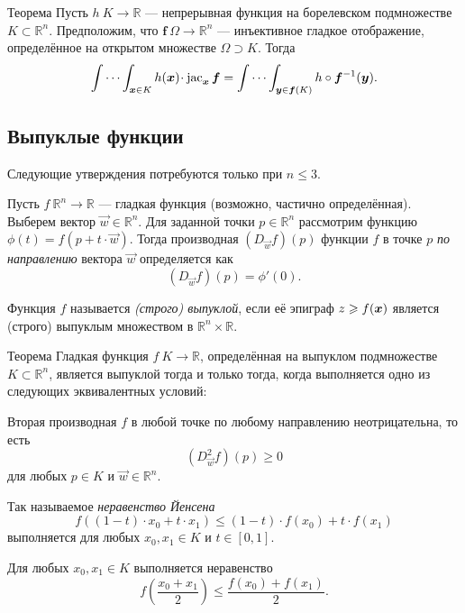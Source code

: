 \begin{thm}{Теорема}\label{thm:mult-substitution} 
Пусть $h\:K\to\mathbb{R}$ --- непрерывная функция на борелевском подмножестве $K\subset \mathbb{R}^n$.
Предположим, что $\bm{f}\:\Omega\to \mathbb{R}^n$ --- инъективное гладкое отображение, определённое на открытом множестве $\Omega\supset K$.
Тогда
\[\idotsint_{\bm{x}\in K} h(\bm{x})\cdot \jac_{\bm{x}}\bm{f}
=
\idotsint_{\bm{y}\in \bm{f}(K)} h\circ \bm{f}^{-1}(\bm{y}).\]

\end{thm}

\subsection*{Выпуклые функции}

Следующие утверждения потребуются только при $n\le 3$.

Пусть $f\:\mathbb{R}^n\to \mathbb{R}$ --- гладкая функция (возможно, частично определённая).
Выберем вектор $\vec w\in \mathbb{R}^n$.
Для заданной точки $p\in\mathbb{R}^n$ рассмотрим функцию $\phi(t)=f(p+t\cdot \vec w)$.
Тогда производная $(D_{\vec w}f)(p)$ функции $f$ в точке $p$ \emph{по направлению} вектора $\vec w$ определяется как
\[(D_{\vec w}f)(p)=\phi'(0).\]

Функция $f$ называется \emph{(строго) выпуклой}, если её эпиграф $z\z\ge f(\bm{x})$ является (строго) выпуклым множеством в $\mathbb{R}^n\times \mathbb{R}$.

\begin{thm}{Теорема}\label{thm:Jensen}
Гладкая функция $f\:K\to \mathbb{R}$, определённая на выпуклом подмножестве $K\subset\mathbb{R}^n$, является выпуклой тогда и только тогда, когда выполняется одно из следующих эквивалентных условий:

\begin{subthm}{}
Вторая производная $f$ в любой точке по любому направлению неотрицательна, то есть
\[(D_{\vec w}^2f)(p)\ge 0\]
для любых $p\in K$ и $\vec w\in\mathbb{R}^n$.
\end{subthm}

\begin{subthm}{}
Так называемое \emph{неравенство Йенсена}
\[f \left ((1-t)\cdot x_0 + t\cdot x_1 \right ) \le (1-t)\cdot f(x_0)+ t\cdot f(x_1)\]
выполняется для любых $x_0,x_1\in K$ и $t\in[0,1]$.

\end{subthm}

\begin{subthm}{}
Для любых $x_0,x_1\in K$ выполняется неравенство
\[f \left (\frac{x_0 + x_1}2 \right ) \le \frac{f(x_0) + f(x_1)}2.\]
\end{subthm}

\end{thm}

